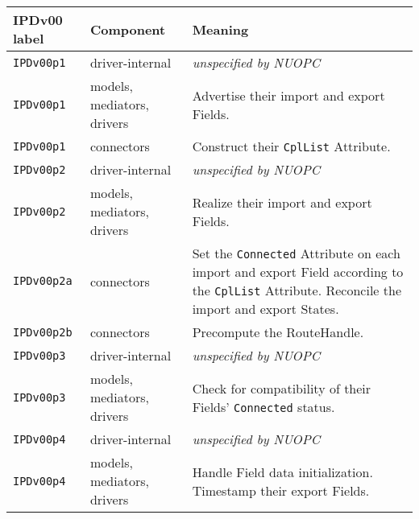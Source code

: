 \vspace*{2ex}
\begin{longtable}[h]{|p{}|p{}|p{}|}
     \hline\hline
     {\bf IPDv00 label} & {\bf Component} & {\bf Meaning}\\
     \hline\hline
     {\tt IPDv00p1} & driver-internal             & {\em unspecified by NUOPC}\\ \hline
     {\tt IPDv00p1} & models, mediators, drivers  & Advertise their import and export Fields.\\ \hline
     {\tt IPDv00p1} & connectors                  & Construct their {\tt CplList} Attribute.\\ \hline
     {\tt IPDv00p2} & driver-internal             & {\em unspecified by NUOPC}\\ \hline
     {\tt IPDv00p2} & models, mediators, drivers  & Realize their import and export Fields.\\ \hline
     {\tt IPDv00p2a}& connectors                  & Set the {\tt Connected} Attribute on each import and export Field according to the {\tt CplList} Attribute. Reconcile the import and export States.\\ \hline
     {\tt IPDv00p2b}& connectors                  & Precompute the RouteHandle.\\ \hline
     {\tt IPDv00p3} & driver-internal             & {\em unspecified by NUOPC}\\ \hline
     {\tt IPDv00p3} & models, mediators, drivers  & Check for compatibility of their Fields' {\tt Connected} status.\\ \hline
     {\tt IPDv00p4} & driver-internal             & {\em unspecified by NUOPC}\\ \hline
     {\tt IPDv00p4} & models, mediators, drivers  & Handle Field data initialization. Timestamp their export Fields.\\
     \hline\hline
\end{longtable}


